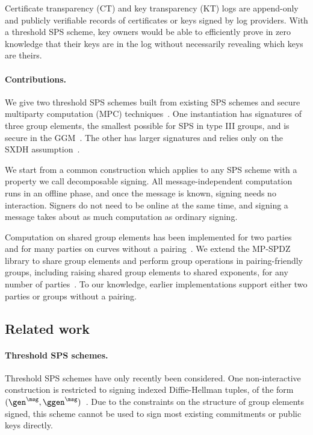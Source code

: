 Certificate transparency (CT) and key transparency (KT) logs are append-only
and publicly verifiable records of certificates or keys signed by log providers.
With a threshold SPS scheme, key owners would be able to efficiently prove in
zero knowledge that their keys are in the log without necessarily revealing
which keys are theirs.

\paragraph{Contributions.} We give two threshold SPS schemes
built from existing SPS schemes and secure multiparty computation (MPC)
techniques~\cite{C:AGHO11,C:KilPanWee15,C:DPSZ12,CCS:KelOrsSch16,C:GLOPS21}.
One instantiation has signatures of three group elements, the smallest possible
for SPS in type III groups, and is secure in the GGM~\cite{C:AGHO11}. The other
has larger signatures and relies only on the SXDH
assumption~\cite{C:KilPanWee15}.

We start from a common construction which applies to any SPS scheme with a
property we call decomposable signing. All message-independent computation runs
in an offline phase, and once the message is known, signing
needs no interaction. Signers do not need to be online at the same time,
and signing a message takes about as much computation as ordinary signing.

Computation on shared group elements has been implemented for two
parties~\cite{NDSS:GPVRNC23,LC:ADEO21} and for many parties on curves without a
pairing~\cite{ESORICS:DOKSS20}.  We extend the MP-SPDZ library to share group
elements and perform group operations in pairing-friendly groups, including raising
shared group elements to shared exponents, for any number
of parties~\cite{CCS:Keller20}. To our knowledge, earlier implementations
support either two parties or groups without a pairing.

\subsection*{Related work}

\paragraph{Threshold SPS schemes.} Threshold SPS schemes have only recently
been considered. One non-interactive construction is restricted to signing
indexed Diffie-Hellman tuples, of the form $(\gen^\msg,
\ggen^\msg)$~\cite{AC:CKPSS23}. Due to the constraints on the structure of
group elements signed, this scheme cannot be used to sign most existing commitments
or public keys directly.

